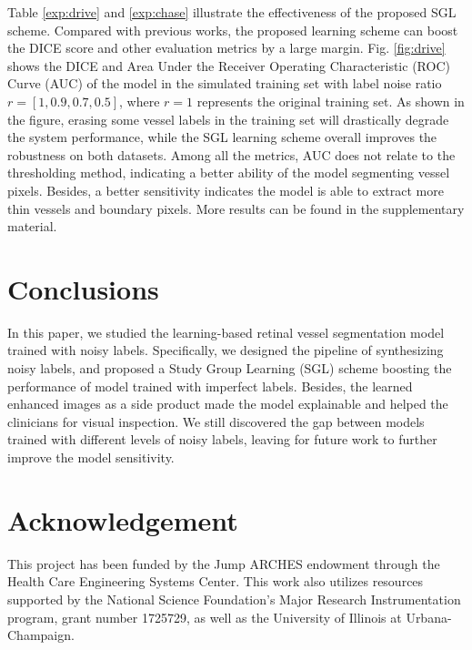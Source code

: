 \documentclass[runningheads]{llncs}
\begin{document}
Table \ref{exp:drive} and \ref{exp:chase} illustrate the effectiveness of the proposed SGL scheme. Compared with previous works, the proposed learning scheme can boost the DICE score \cite{sorensen1948method} and other evaluation metrics by a large margin. Fig. \ref{fig:drive} shows the DICE and Area Under the Receiver Operating Characteristic (ROC) Curve (AUC) of the model in the simulated training set with label noise ratio $r=[1, 0.9, 0.7, 0.5]$, where $r=1$ represents the original training set. As shown in the figure, erasing some vessel labels in the training set will drastically degrade the system performance, while the SGL learning scheme overall improves the robustness on both datasets. Among all the metrics, AUC does not relate to the thresholding method, indicating a better ability of the model segmenting vessel pixels. Besides, a better sensitivity indicates the model is able to extract more thin vessels and boundary pixels. More results can be found in the supplementary material.

\section{Conclusions}
In this paper, we studied the learning-based retinal vessel segmentation model trained with noisy labels. Specifically, we designed the pipeline of synthesizing noisy labels, and proposed a Study Group Learning (SGL) scheme boosting the performance of model trained with imperfect labels. Besides, the learned enhanced images as a side product made the model explainable and helped the clinicians for visual inspection. We still discovered the gap between models trained with different levels of noisy labels, leaving for future work to further improve the model sensitivity.

\section{Acknowledgement}
This project has been funded by the Jump ARCHES endowment through the Health Care Engineering Systems Center. This work also utilizes resources supported by the National Science Foundation’s Major Research Instrumentation program, grant number 1725729, as well as the University of Illinois at Urbana-Champaign.
\end{document}
